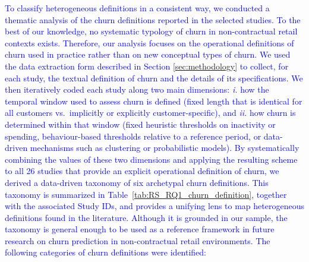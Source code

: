 \documentclass[preprint,12pt]{elsarticle}
\begin{document}







\textcolor{blue}{To classify heterogeneous definitions in a consistent way, we conducted a thematic analysis of the churn definitions reported in the selected studies. To the best of our knowledge, no systematic typology of churn in non-contractual retail contexts exists.  Therefore, our analysis focuses on the operational definitions of churn used in practice rather than on new conceptual types of churn.
We used the data extraction form described in Section \ref{sec:methodology} to collect, for each study, the textual definition of churn and the details of its specifications.
We then iteratively coded each study along two main dimensions: \emph{i.} how the temporal window used to assess churn is defined (fixed length that is identical for all customers vs.\ implicitly or explicitly customer-specific), and \emph{ii.} how churn is determined within that window (fixed heuristic thresholds on inactivity or spending, behaviour-based thresholds relative to a reference period, or data-driven mechanisms such as clustering or probabilistic models). 
By systematically combining the values of these two dimensions and applying the resulting scheme to all 26 studies that provide an explicit operational definition of churn, we derived a data-driven taxonomy of six archetypal churn definitions. This taxonomy is summarized in Table~\ref{tab:RS_RQ1_churn_definition}, together with the associated Study IDs, and provides a unifying lens to map heterogeneous definitions found in the literature. Although it is grounded in our sample, the taxonomy is general enough to be used as a reference framework in future research on churn prediction in non-contractual retail environments.
The following categories of churn definitions were identified:}
\end{document}

